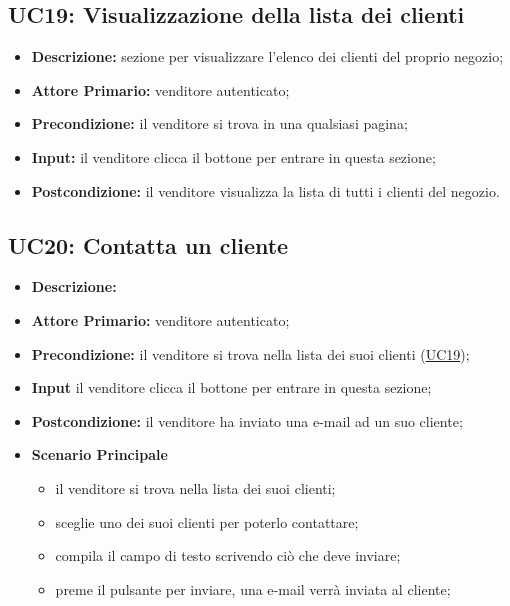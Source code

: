         \subsection{UC19: Visualizzazione della lista dei clienti}
        \label{sec:UC19}
            \begin{itemize}
                \item \textbf{Descrizione:} sezione per visualizzare l'elenco dei clienti del proprio negozio;
                \item \textbf{Attore Primario:} venditore autenticato; 
                \item \textbf{Precondizione:} il venditore si trova in una qualsiasi pagina;
                \item \textbf{Input:} il venditore clicca il bottone per entrare in questa sezione; 
                \item \textbf{Postcondizione:} il venditore visualizza la lista di tutti i clienti del negozio.
                \end{itemize}


        \subsection{UC20: Contatta un cliente}
        \begin{itemize}
            \item \textbf{Descrizione:}
            \item \textbf{Attore Primario:} venditore autenticato;
            \item \textbf{Precondizione:} il venditore si trova nella lista dei suoi clienti (\hyperref[sec:UC19]{UC19});
            \item \textbf{Input} il venditore clicca il bottone per entrare in questa sezione; 
            \item \textbf{Postcondizione:} il venditore ha inviato una e-mail ad un suo cliente;
            \item \textbf{Scenario Principale}
                \begin{itemize}
                    \item il venditore si trova nella lista dei suoi clienti;
                    \item sceglie uno dei suoi clienti per poterlo contattare;
                    \item compila il campo di testo scrivendo ciò che deve inviare;
                    \item preme il pulsante per inviare, una e-mail verrà inviata al cliente;
                \end{itemize}
        \end{itemize}


